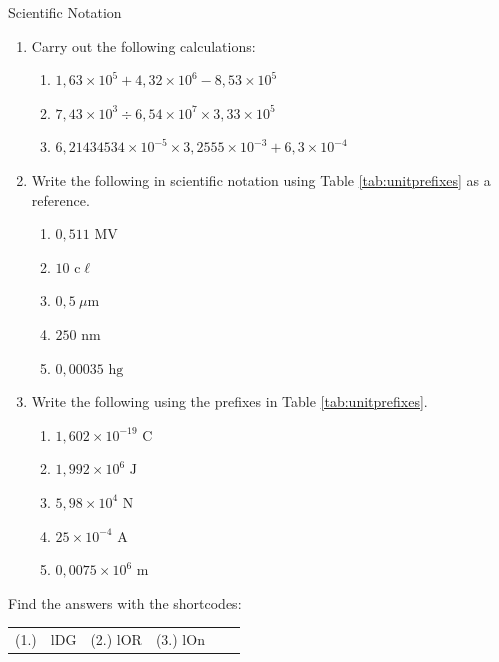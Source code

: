 \begin{exercises}{Scientific Notation }
            \nopagebreak \noindent
\begin{enumerate}[noitemsep, label=\textbf{\arabic*}. ] 
 \item Carry out the following calculations:
    \begin{enumerate}[noitemsep, label=\textbf{\alph*}. ] 
     \item $1,63 \times 10^{5} + 4,32 \times 10^{6} - 8,53 \times 10^{5}$
     \item $7,43 \times 10^{3} \div 6,54 \times 10^{7} \times 3,33 \times 10^{5}$
     \item $6,21434534 \times 10^{-5} \times 3,2555 \times 10^{-3} + 6,3 \times 10^{-4}$
    \end{enumerate}
  \item Write the following in scientific notation using Table \ref{tab:unitprefixes} as a reference.
    \begin{enumerate}[noitemsep, label=\textbf{\alph*}. ] 
      \item $0,511 \text{ MV}$
      \item $10 \text{ c}\ell $
      \item $0,5 ~\mu\text{m}$
      \item $250 \text{ nm}$
      \item $0,00035 \text{ hg}$
    \end{enumerate}
  \item Write the following using the prefixes in Table \ref{tab:unitprefixes}.
    \begin{enumerate}[noitemsep, label=\textbf{\alph*}. ] 
      \item $1,602 \times{10}^{-19} \text{ C}$
      \item $1,992 \times{10}^{6} \text { J}$
      \item $5,98 \times{10}^{4} \text{ N}$
      \item $25 \times{10}^{-4} \text{ A}$
      \item $0,0075 \times{10}^{6} \text{ m}$
    \end{enumerate}
\end{enumerate}
\par {} Find the answers with the shortcodes:
 \par \begin{tabular}[h]{cccccc}
(1.) & lDG & (2.) lOR  &  (3.) lOn  & \end{tabular}
\end{exercises}
